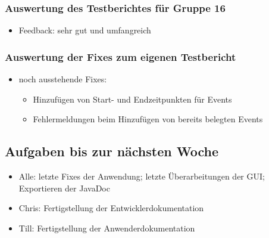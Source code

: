 \documentclass[12pt,a4paper]{article}
\begin{document}
\subsubsection*{Auswertung des Testberichtes für Gruppe 16}
\begin{itemize}
\item Feedback: sehr gut und umfangreich
\end{itemize}

\subsubsection*{Auswertung der Fixes zum eigenen Testbericht}
\begin{itemize}
\item noch ausstehende Fixes:
\begin{itemize}
\item Hinzufügen von Start- und Endzeitpunkten für Events
\item Fehlermeldungen beim Hinzufügen von bereits belegten Events
\end{itemize}
\end{itemize}

\subsection*{Aufgaben bis zur nächsten Woche}
\medskip
\begin{itemize}
\item Alle: letzte Fixes der Anwendung; letzte Überarbeitungen der GUI; Exportieren der JavaDoc
\item Chris: Fertigstellung der Entwicklerdokumentation
\item Till: Fertigstellung der Anwenderdokumentation
\end{itemize}
\end{document}
